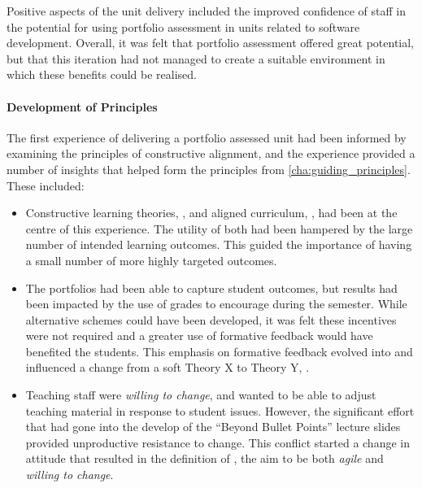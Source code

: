 Positive aspects of the unit delivery included the improved confidence of staff in the potential for using portfolio assessment in units related to software development. Overall, it was felt that portfolio assessment offered great potential, but that this iteration had not managed to create a suitable environment in which these benefits could be realised.

\paragraph{Development of Principles} %

The first experience of delivering a portfolio assessed unit had been informed by examining the principles of constructive alignment, and the experience provided a number of insights that helped form the principles from \cref{cha:guiding_principles}. These included:

\begin{itemize}[noitemsep,nolistsep]
	\item Constructive learning theories, , and aligned curriculum, , had been at the centre of this experience. The utility of both had been hampered by the large number of intended learning outcomes. This guided the importance of having a small number of more highly targeted outcomes.
	\item The portfolios had been able to capture student outcomes, but results had been impacted by the use of grades to encourage during the semester. While alternative schemes could have been developed, it was felt these incentives were not required and a greater use of formative feedback would have benefited the students. This emphasis on formative feedback evolved into  and influenced a change from a soft Theory X to Theory Y, .
	\item Teaching staff were \emph{willing to change}, and wanted to be able to adjust teaching material in response to student issues. However, the significant effort that had gone into the develop of the ``Beyond Bullet Points'' lecture slides provided unproductive resistance to change. This conflict started a change in attitude that resulted in the definition of , the aim to be both \emph{agile} and \emph{willing to change}.
\end{itemize}



